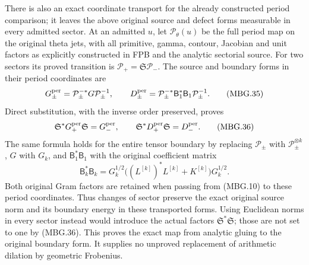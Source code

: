 There is also an exact coordinate transport for the already constructed
period comparison; it leaves the above original source and defect
forms measurable in every admitted sector. At an admitted \(u\), let
\(\mathcal P_\theta(u)\) be the full period map on the original theta
jets, with all primitive, gamma, contour, Jacobian and unit factors
as explicitly constructed in FPB and the analytic sectorial source.
For two sectors its proved transition is
\(\mathcal P_+=\mathfrak S\mathcal P_-\).
The source and boundary forms in their period coordinates are
\[
 G^{\rm per}_\pm=\mathcal P_\pm^{-*}G\mathcal P_\pm^{-1},
 \qquad
 D^{\rm per}_\pm=\mathcal P_\pm^{-*}\mathsf B_1^*\mathsf B_1
                                            \mathcal P_\pm^{-1}.
 \tag{MBG.35}\label{eq:mbg-period-forms}
\]
Direct substitution, with the inverse order preserved, proves
\[
 \mathfrak S^*G^{\rm per}_+\mathfrak S=G^{\rm per}_-,\qquad
 \mathfrak S^*D^{\rm per}_+\mathfrak S=D^{\rm per}_- .
 \tag{MBG.36}\label{eq:mbg-period-isometry}
\]
The same formula holds for the entire tensor boundary by replacing
\(\mathcal P_\pm\) with \(\mathcal P_\pm^{\otimes k}\),
\(G\) with \(G_k\), and \(\mathsf B_1^*\mathsf B_1\) with the
original coefficient matrix
\[
 \mathsf B_k^*\mathsf B_k
   =G_k^{1/2}\bigl((L^{[k]})^*L^{[k]}+K^{[k]}\bigr)G_k^{1/2}.
 \tag{MBG.37}\label{eq:mbg-original-boundary-matrix}
\]
Both original Gram factors are retained when passing from (MBG.10)
to these period coordinates. Thus changes of sector preserve the exact
original source norm and its boundary energy in these transported
forms. Using Euclidean norms in every sector instead would introduce
the actual factors \(\mathfrak S^*\mathfrak S\); those are not set to
one by (MBG.36). This proves the exact map from analytic gluing to the
original boundary form. It supplies no unproved replacement of
arithmetic dilation by geometric Frobenius.
